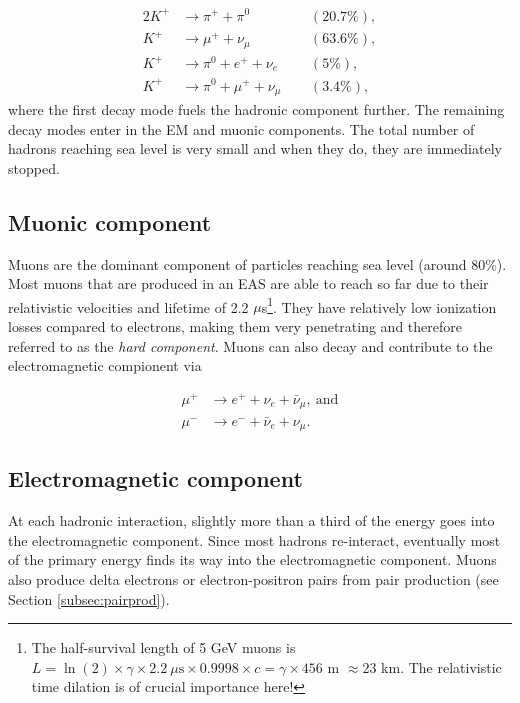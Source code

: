 \begin{alignat}{2}
K^+ &\rightarrow \pi^+ + \pi^0  &&(20.7\%),\nonumber \\
K^+ &\rightarrow \mu^+ + \nu_{\mu}  &&(63.6\%),\nonumber \\
K^+ &\rightarrow \pi^0 + e^+ + \nu_e  &&(5\%),\nonumber \\
K^+ &\rightarrow \pi^0 + \mu^+ + \nu_{\mu}  \ \ &&(3.4\%), \label{eq:hadronic} 
\end{alignat} 
where the first decay mode fuels the hadronic component further. The remaining decay modes enter in the EM and muonic components. The total number of hadrons reaching sea level is very small and when they do, they are immediately stopped.

\subsection{Muonic component}
Muons are the dominant component of particles reaching sea level (around 80\%). Most muons that are produced in an EAS are able to reach so far due to their relativistic velocities and lifetime of 2.2 $\mu$s\footnote{The half-survival length of 5 GeV muons is $L = \ln(2) \times \gamma \times 2.2 \ \mu\textrm{s} \times 0.9998 \times c = \gamma \times 456$ m $\approx 23$ km. The relativistic time dilation is of crucial importance here!}. They have relatively low ionization losses compared to electrons, making them very penetrating and therefore referred to as the \textit{hard component}. Muons can also decay and contribute to the electromagnetic compionent via

\begin{equation}
\label{eq:muonic}
\begin{split}
\mu^+ &\rightarrow e^+ + \nu_e + \bar{\nu}_\mu, \ \textrm{and} \\
\mu^- &\rightarrow e^- + \bar{\nu}_e + \nu_\mu.
\end{split}
\end{equation}

\subsection{Electromagnetic component}
At each hadronic interaction, slightly more than a third of the energy goes into the electromagnetic component. Since most hadrons re-interact, eventually most of the primary energy finds its way into the electromagnetic component. Muons also produce delta electrons or electron-positron pairs from pair production (see Section \ref{subsec:pairprod}).

